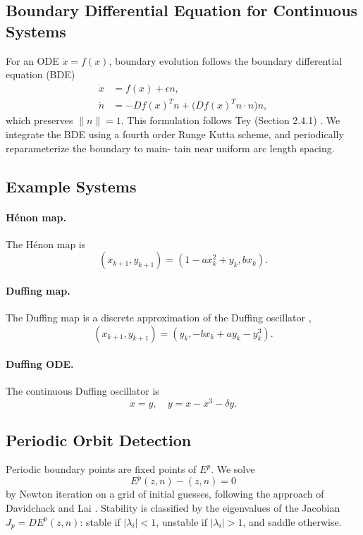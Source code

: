 \documentclass[11pt,twocolumn]{article}
\begin{document}
\subsection{Boundary Differential Equation for Continuous Systems}
For an ODE $\dot{x} = f(x)$, boundary evolution follows the boundary differential equation (BDE)
\begin{align}
\dot{x} &= f(x) + \epsilon n, \\
\dot{n} &= -Df(x)^T n + \bigl(Df(x)^T n \cdot n\bigr) n,
\end{align}
which preserves $\|n\| = 1$. This formulation follows Tey (Section 2.4.1) \cite{tey2023}. We integrate the BDE using a fourth order Runge Kutta scheme, and periodically reparameterize the boundary to main-
tain near uniform arc length spacing.


\subsection{Example Systems}
\paragraph{H\'enon map.} The H\'enon map is \cite{henon1976}
\begin{equation}
(x_{k+1}, y_{k+1}) = (1 - a x_k^2 + y_k, b x_k).
\end{equation}
\paragraph{Duffing map.} The Duffing map is a discrete approximation of the Duffing oscillator \cite{duffing1918},
\begin{equation}
(x_{k+1}, y_{k+1}) = (y_k, -b x_k + a y_k - y_k^3).
\end{equation}
\paragraph{Duffing ODE.} The continuous Duffing oscillator is \cite{duffing1918}
\begin{equation}
\dot{x} = y, \quad \dot{y} = x - x^3 - \delta y.
\end{equation}

\subsection{Periodic Orbit Detection}
Periodic boundary points are fixed points of $E^p$. We solve
\begin{equation}
E^p(z,n) - (z,n) = 0
\end{equation}
by Newton iteration on a grid of initial guesses, following the approach of Davidchack and Lai \cite{davidchack1999}. Stability is classified by the eigenvalues of the Jacobian $J_p = D E^p(z,n)$: stable if $|\lambda_i| < 1$, unstable if $|\lambda_i| > 1$, and saddle otherwise.
\end{document}
